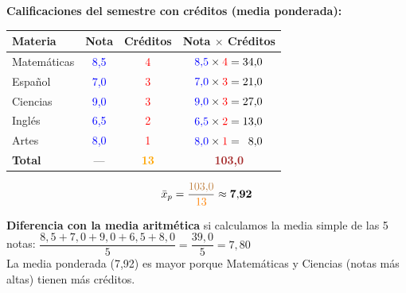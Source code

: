 \documentclass[12pt, letterpaper]{article}
\begin{document}
	\begin{ejemplo}
		\textbf{Calificaciones del semestre con créditos (media ponderada):}
		
		\vspace{0.2cm}
		\begin{center}
			\renewcommand{\arraystretch}{1.6}
			\begin{tabular}{|m{4cm}|c|c|c|}
				\hline
				\rowcolor{valblue!20}
				\textbf{Materia} & \textbf{Nota} & \textbf{Créditos} &
				\textbf{Nota $\times$ Créditos} \\
				\hline
				Matemáticas  & \textcolor{blue}{8{,}5} & \textcolor{red}{4} & $\textcolor{blue}{8{,}5} \times \textcolor{red}{4} = 34{,}0$ \\
				\hline
				Español      & \textcolor{blue}{7{,}0} & \textcolor{red}{3} & $\textcolor{blue}{7{,}0} \times \textcolor{red}{3} = 21{,}0$ \\
				\hline
				Ciencias     & \textcolor{blue}{9{,}0} & \textcolor{red}{3} & $\textcolor{blue}{9{,}0} \times \textcolor{red}{3} = 27{,}0$ \\
				\hline
				Inglés       & \textcolor{blue}{6{,}5} & \textcolor{red}{2} & $\textcolor{blue}{6{,}5} \times \textcolor{red}{2} = 13{,}0$ \\
				\hline
				Artes        & \textcolor{blue}{8{,}0} & \textcolor{red}{1} & $\textcolor{blue}{8{,}0} \times \textcolor{red}{1} = \phantom{1}8{,}0$ \\
				\hline
				\rowcolor{valblue!10}
				\textbf{Total} & --- & \textbf{\textcolor{orange}{13}} & \textbf{\textcolor{brown}{103{,}0}} \\
				\hline
			\end{tabular}
		\end{center}
		
		$$\bar{x}_p = \dfrac{\textcolor{brown}{103{,}0}}{\textcolor{orange}{13}} \approx \mathbf{7{,}92}$$
		
		\textbf{Diferencia con la media aritmética} si calculamos la media simple de las 5 notas:
		$\dfrac{8{,}5+7{,}0+9{,}0+6{,}5+8{,}0}{5} = \dfrac{39{,}0}{5} = 7{,}80$\\
		La media ponderada (7,92) es mayor porque Matemáticas y Ciencias
		(notas más altas) tienen más créditos.
	\end{ejemplo}
	
\end{document}
